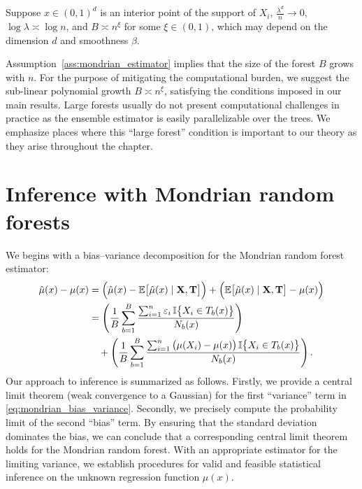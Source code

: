 \begin{assumption}%
  \label{ass:mondrian_estimator}
  Suppose $x \in (0,1)^d$ is an interior point of the support of $X_i$,
  $\frac{\lambda^d}{n} \to 0$,
  $\log \lambda \asymp \log n$,
  and $B \asymp n^{\xi}$ for some $\xi \in (0, 1)$,
  which may depend on the dimension $d$ and smoothness $\beta$.
\end{assumption}

Assumption~\ref{ass:mondrian_estimator} implies that the size of the forest $B$
grows
with $n$. For the purpose of mitigating the computational burden, we suggest
the sub-linear polynomial growth $B \asymp n^{\xi}$, satisfying the conditions
imposed in our main results. Large forests usually do not present computational
challenges in practice as the ensemble estimator is easily parallelizable over
the trees. We emphasize places where this ``large forest'' condition is
important to our theory as they arise throughout the chapter.

\section{Inference with Mondrian random forests}%
\label{sec:mondrian_inference}

We begins with a bias--variance decomposition for the Mondrian random
forest estimator:
%
\begin{align}
  \nonumber
  \hat\mu(x) - \mu(x)
  &=
  \Big( \hat\mu(x) - \mathbb{E} \big[ \hat \mu(x) \mid \mathbf{X}, \mathbf{T} \big]\Big)
  + \Big( \mathbb{E} \big[ \hat \mu(x) \mid \mathbf{X}, \mathbf{T} \big] - \mu(x)\Big) \\
  &=
  \nonumber
  \left(
    \frac{1}{B} \sum_{b=1}^B
    \frac{\sum_{i=1}^n \varepsilon_i \, \mathbb{I}\big\{ X_i \in T_b(x) \big\}} {N_b(x)}
  \right) \\
  \label{eq:mondrian_bias_variance}
  &\quad+
  \left(
    \frac{1}{B} \sum_{b=1}^B
    \frac{\sum_{i=1}^n \big(\mu(X_i) - \mu(x)\big) \,
    \mathbb{I}\big\{ X_i \in T_b(x) \big\}} {N_b(x)}
  \right).
\end{align}
%
Our approach to inference is summarized as follows. Firstly, we provide a
central limit theorem (weak convergence to a Gaussian) for the first
``variance'' term in \eqref{eq:mondrian_bias_variance}. Secondly, we precisely
compute
the probability limit of the second ``bias'' term. By ensuring that the
standard deviation dominates the bias, we can conclude that a corresponding
central limit theorem holds for the Mondrian random forest. With an appropriate
estimator for the limiting variance, we establish procedures for valid and
feasible statistical inference on the unknown regression function $\mu(x)$.

